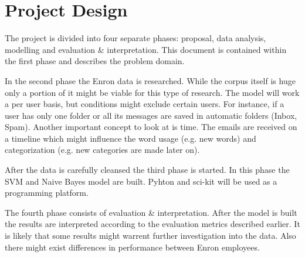 \documentclass{article}
\begin{document}
\section*{Project Design}

The project is divided into four separate phases: proposal, data analysis, modelling and evaluation \& interpretation. This document is contained within the first phase and describes the problem domain.

In the second phase the Enron data is researched. While the corpus itself is huge only a portion of it might be viable for this type of research. The model will work a per user basis, but conditions might exclude certain users. For instance, if a user has only one folder or all its messages are saved in automatic folders (Inbox, Spam). Another important concept to look at is time. The emails are received on a timeline which might influence the word usage (e.g. new words) and categorization (e.g. new categories are made later on).

After the data is carefully cleansed the third phase is started. In this phase the SVM and Naive Bayes model are built. 
Pyhton and sci-kit will be used as a programming platform. 

The fourth phase consists of evaluation \& interpretation. After the model is built the results are interpreted according to the evaluation metrics described earlier. It is likely that some results might warrent further investigation into the data. Also there might exist differences in performance between Enron employees. 



\end{document}
